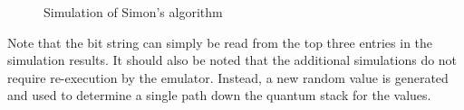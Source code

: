 \begin{figure}[htbp]
\caption{Simulation of  Simon's algorithm}\label{fig:emsimonsims}
\end{figure}

Note that the bit string can simply be read from the top three entries
in the simulation results. It should also be noted that the additional
simulations do not require re-execution by the emulator. Instead, a new
random value is generated and used to determine a single path down the
quantum stack for the values.




